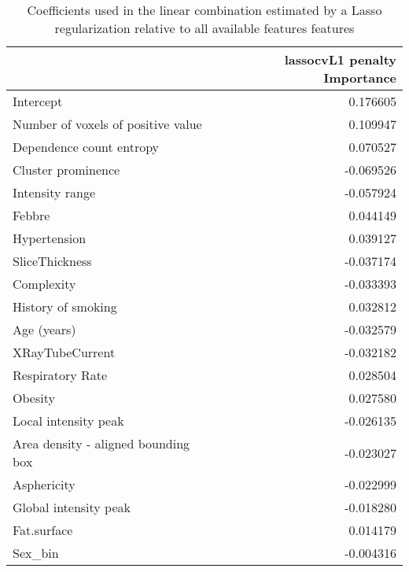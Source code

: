 \begin{table}
	\caption{Coefficients used in the linear combination estimated by a Lasso regularization relative to all available features features\label{tab:ParamAll}}
		\centering
		\begin{tabular}{lr}
		\toprule
		{} &  lassocvL1 penalty Importance \\
		\midrule
		Intercept                           &                      0.176605 \\
		Number of voxels of positive value  &                      0.109947 \\
		Dependence count entropy            &                      0.070527 \\
		Cluster prominence                  &                     -0.069526 \\
		Intensity range                     &                     -0.057924 \\
		Febbre                              &                      0.044149 \\
		Hypertension                        &                      0.039127 \\
		SliceThickness                      &                     -0.037174 \\
		Complexity                          &                     -0.033393 \\
		History of smoking                  &                      0.032812 \\
		Age (years)                         &                     -0.032579 \\
		XRayTubeCurrent                     &                     -0.032182 \\
		Respiratory Rate                    &                      0.028504 \\
		Obesity                             &                      0.027580 \\
		Local intensity peak                &                     -0.026135 \\
		Area density - aligned bounding box &                     -0.023027 \\
		Asphericity                         &                     -0.022999 \\
		Global intensity peak               &                     -0.018280 \\
		Fat.surface                         &                      0.014179 \\
		Sex\_bin                             &                     -0.004316 \\

\end{tabular}
\end{table}
